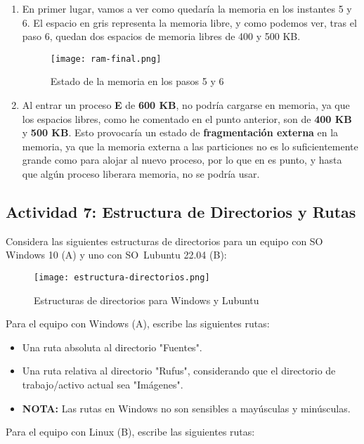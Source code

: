 \begin{enumerate}[label=(\alph*)]
    \item En primer lugar, vamos a ver como quedaría la memoria en los instantes 5 y 6. El espacio en gris representa la memoria libre, y como podemos ver, tras el paso 6, quedan dos espacios de memoria libres de 400 y 500 KB.
    \begin{figure}[ht]
        \centering
        \texttt{[image: ram-final.png]}
        \caption{Estado de la memoria en los pasos 5 y 6}
    \end{figure}
    \item Al entrar un proceso \textbf{E} de \textbf{600 KB}, no podría cargarse en memoria, ya que los espacios libres, como he comentado en el punto anterior, son de \textbf{400 KB} y \textbf{500 KB}. Esto provocaría un estado de \textbf{fragmentación externa} en la memoria, ya que la memoria externa a las particiones no es lo suficientemente grande como para alojar al nuevo proceso, por lo que en es punto, y hasta que algún proceso liberara memoria, no se podría usar.
\end{enumerate}

\subsection{Actividad 7: Estructura de Directorios y Rutas}
Considera las siguientes estructuras de directorios para un equipo con SO Windows 10 (A) y uno con SO Lubuntu 22.04 (B):

\begin{figure}[ht]
    \centering
    \texttt{[image: estructura-directorios.png]}
    \caption{Estructuras de directorios para Windows y Lubuntu}
\end{figure}

Para el equipo con Windows (A), escribe las siguientes rutas:

\begin{itemize}
    \item Una ruta absoluta al directorio "Fuentes".
    \item Una ruta relativa al directorio "Rufus", considerando que el directorio de trabajo/activo actual sea "Imágenes".
    \item \textbf{NOTA:} Las rutas en Windows no son sensibles a mayúsculas y minúsculas.
\end{itemize}

Para el equipo con Linux (B), escribe las siguientes rutas:

